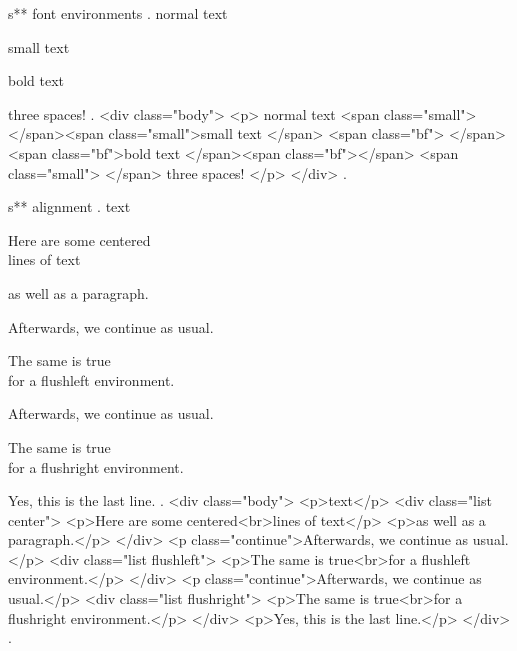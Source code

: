 s** font environments
.
normal text \begin{small}
    small text
    \begin{bfseries}
        bold text
    \end{bfseries}
\end{small}
  three spaces!
.
<div class="body">
<p>
normal text <span class="small">​ </span><span class="small">small text </span>
<span class="bf">​ </span><span class="bf">bold text </span><span class="bf">​ </span>
<span class="small">​ </span>
three spaces!
</p>
</div>
.


s** alignment
.
text
\begin{center}
    Here are some centered\\
    lines of text

    as well as a paragraph.
\end{center}
Afterwards, we continue as usual.
\begin{flushleft}
    The same is true\\
    for a flushleft environment.
\end{flushleft}
Afterwards, we continue as usual.
\begin{flushright}
    The same is true\\
    for a flushright environment.
\end{flushright}

Yes, this is the last line.
.
<div class="body">
<p>text</p>
<div class="list center">
<p>Here are some centered<br>lines of text</p>
<p>as well as a paragraph.</p>
</div>
<p class="continue">Afterwards, we continue as usual.</p>
<div class="list flushleft">
<p>The same is true<br>for a ﬂushleft environment.</p>
</div>
<p class="continue">Afterwards, we continue as usual.</p>
<div class="list flushright">
<p>The same is true<br>for a ﬂushright environment.</p>
</div>
<p>Yes, this is the last line.</p>
</div>
.


